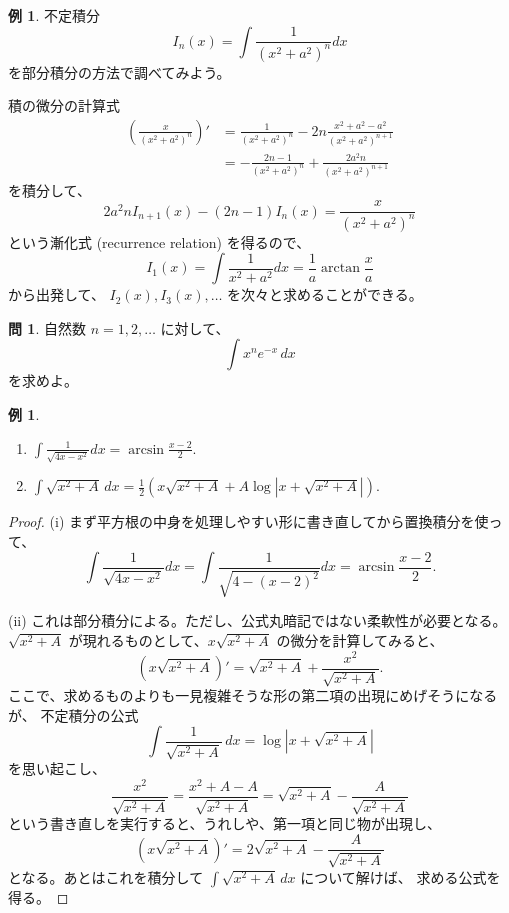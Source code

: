 \documentclass[a4paper]{jsarticle}
\theoremstyle{definition}
\newtheorem{Example}[Theorem]{例}
\newtheorem{Exercise}{問}%
\theoremstyle{remark}
\begin{document}
\begin{Example}\label{ratio2}
不定積分
\[
I_n(x) = \int \frac{1}{(x^2+a^2)^n}dx
\]
を部分積分の方法で調べてみよう。

積の微分の計算式
\begin{align*}
\left(
\frac{x}{(x^2+a^2)^n}
\right)'
&= \frac{1}{(x^2+a^2)^n} - 2n\frac{x^2+a^2-a^2}{(x^2+a^2)^{n+1}}\\
&= -\frac{2n-1}{(x^2+a^2)^n} + \frac{2a^2n}{(x^2+a^2)^{n+1}}
\end{align*}
を積分して、
\[
2a^2n I_{n+1}(x) - (2n-1) I_n(x) = \frac{x}{(x^2+a^2)^n}
\]
という漸化式 (recurrence relation) を得るので、
\[
I_1(x) = \int \frac{1}{x^2+a^2}dx =
\frac{1}{a} \arctan \frac{x}{a}
\]
から出発して、
$I_2(x), I_3(x), \dots$ を次々と求めることができる。
\end{Example}

\begin{Exercise}
自然数 $n=1,2,\dots$ に対して、
\[
\int x^ne^{-x}\,dx
\]
を求めよ。
\end{Exercise}

\begin{Example}~
\begin{enumerate}
\item
$\displaystyle \int \frac{1}{\sqrt{4x-x^2}} dx = \arcsin \frac{x-2}{2}$.
\item
$\displaystyle \int \sqrt{x^2+A}\,dx = 
\frac{1}{2} \left( x\sqrt{x^2+A} + A\log|x+\sqrt{x^2+A}| \right)$. 
\end{enumerate}
\end{Example}

\begin{proof}
(i) まず平方根の中身を処理しやすい形に書き直してから置換積分を使って、
\[
\int \frac{1}{\sqrt{4x-x^2}} dx = 
\int \frac{1}{\sqrt{4 - (x-2)^2}} dx 
= \arcsin \frac{x-2}{2}. 
\]

(ii) これは部分積分による。ただし、公式丸暗記ではない柔軟性が必要となる。
$\sqrt{x^2 + A}$ が現れるものとして、$x\sqrt{x^2+A}$ の微分を計算してみると、
\[
(x\sqrt{x^2+A})' = \sqrt{x^2+A} + \frac{x^2}{\sqrt{x^2+A}}.
\]
ここで、求めるものよりも一見複雑そうな形の第二項の出現にめげそうになるが、
不定積分の公式
\[
\int \frac{1}{\sqrt{x^2+A}}\,dx = 
\log\left| x + \sqrt{x^2 + A} \right|
\]
を思い起こし、
\[
\frac{x^2}{\sqrt{x^2 + A}} = \frac{x^2 + A - A}{\sqrt{x^2+A}} 
= \sqrt{x^2 + A} - \frac{A}{\sqrt{x^2+A}}
\]
という書き直しを実行すると、うれしや、第一項と同じ物が出現し、
\[
(x\sqrt{x^2+A})' = 2\sqrt{x^2+A} - \frac{A}{\sqrt{x^2+A}} 
\]
となる。あとはこれを積分して 
$\displaystyle \int \sqrt{x^2+A}\, dx$ について解けば、
求める公式を得る。
\end{proof}
\end{document}
